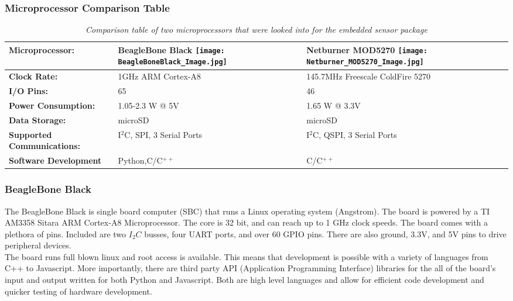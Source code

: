 \subsubsection{Microprocessor Comparison Table}
	\begin{table}
	\centering
	\begin{tabular}{|l| p{3cm} | p{3cm} |}
	\hline
	\textbf{Microprocessor:} & BeagleBone Black 
	\texttt{[image: BeagleBoneBlack\_Image.jpg]}
	& Netburner MOD5270
	\texttt{[image: Netburner\_MOD5270\_Image.jpg]}
	\\
	\hline
	\textbf{Clock Rate:}		&1GHz ARM Cortex-A8& 145.7MHz Freescale ColdFire 5270 \\
	\hline
	\textbf{I/O Pins:}		& 65  &46\\
	\hline
	\textbf{Power Consumption:}&	1.05-2.3 W @ 5V	& 1.65 W @ 3.3V	\\
	\hline
	\textbf{Data Storage:}	&			microSD		&	microSD		\\
	\hline
	\textbf{Supported Communications:}&	I$^2$C, SPI, 3 Serial Ports		&I$^2$C, QSPI, 3 Serial Ports		\\
	\hline
	\textbf{Software Development}&Python,C/C$^{++}$&C/C$^{++}$\\
	\hline
	\end{tabular}
	\caption{\textit{Comparison table of two microprocessors that were looked into for the embedded sensor package}}
	\label{tab:uProcOptions}
	\end{table}

\subsubsection{BeagleBone Black}
\label{subsec:BeagleBoneBlack}
\indent The BeagleBone Black is single board computer (SBC) that runs a Linux operating system (Angstrom). The board is powered by a TI AM3358 Sitara ARM Cortex-A8 Microprocessor. The core is 32 bit, and can reach up to 1 GHz clock speeds. The board comes with a plethora of pins. Included are two $I_2C$ busses, four UART ports, and over 60 GPIO pins. There are also ground, 3.3V, and 5V pins to drive peripheral devices. \\
\indent The board runs full blown linux and root access is available. This means that development is possible with a variety of languages from C++ to Javascript. More importantly, there are third party API (Application Programming Interface) libraries for the all of the board’s input and output written for both Python and Javascript. Both are high level languages and allow for efficient code development and quicker testing of hardware development. 

